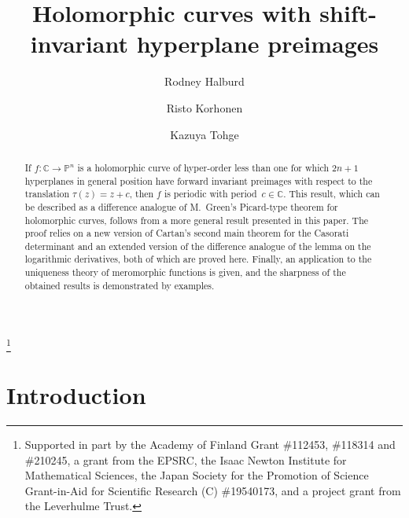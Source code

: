 \documentclass{amsart}
\newcommand{\C}{\mathbb{C}}
\renewcommand{\P}{\mathbb{P}}
\theoremstyle{definition}
\numberwithin{equation}{section}
\numberwithin{theorem}{section}
\begin{document}
\title{Holomorphic curves with shift-invariant hyperplane preimages}

\author{Rodney Halburd}
\address{Department of Mathematics, University College London,
Gower Street, London WC1E 6BT, UK} 
\author{Risto Korhonen}
\address{Department of Physics and Mathematics, University of Eastern Finland, P.O. Box 111,
FI-80101 Joensuu, Finland}
\author{Kazuya Tohge}
\address{Graduate School of Natural Science and Technology, Kanazawa University, Kakuma-machi, Kanazawa, 920-1192, Japan}
\thanks{Supported in part by the Academy of Finland Grant \#112453, \#118314 and \#210245, a grant from the EPSRC, the Isaac Newton Institute for Mathematical Sciences, the Japan Society for the Promotion of Science Grant-in-Aid for Scientific Research (C) \#19540173, and a project grant from the Leverhulme Trust.}


\begin{abstract}
If $f:\C\to\P^n$ is a holomorphic curve of hyper-order less than
one for which $2n+1$ hyperplanes in general position have forward invariant preimages with respect to the
translation $\tau(z)= z+c$, then $f$ is periodic with
period~$c\in\C$. This result, which can be described as a
difference analogue of M.~Green's Picard-type theorem for
holomorphic curves, follows from a more general result presented
in this paper. The proof relies on a new version of Cartan's
second main theorem for the Casorati determinant and an extended
version of the difference analogue of the lemma on the logarithmic
derivatives, both of which are proved here. Finally, an
application to the uniqueness theory of meromorphic functions is
given, and the sharpness of the obtained results is demonstrated
by examples.
\end{abstract}

\maketitle




\section{Introduction}
\end{document}
